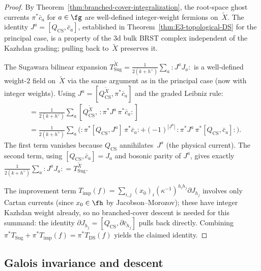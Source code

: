 \begin{proof}
By Theorem~\ref{thm:branched-cover-integralization}, the root-space
ghost currents $\pi^{*}\bar c_{a}$ for $a \in \fg$ are well-defined
integer-weight fermions on~$\widetilde X$. The identity
$J^{a} = [Q_{\mathrm{CS}}, \bar c_{a}]$, established in
Theorem~\ref{thm:E3-topological-DS}
\cite[Step~1]{Vol2-3d-gravity-thm-DS} for the principal case, is a
property of the $3$d bulk BRST complex independent of the Kazhdan
grading; pulling back to~$\widetilde X$ preserves it.

The Sugawara bilinear expansion
$T_{\mathrm{Sug}}^{\widetilde X}
 = \tfrac{1}{2(k+h^{\vee})}\sum_{a} :J^{a} J_{a}:$
is a well-defined weight-$2$ field on~$\widetilde X$ via the same
argument as in the principal case (now with integer weights).
Using $J^{a} = [Q_{\mathrm{CS}}^{\widetilde X}, \pi^{*}\bar c_{a}]$
and the graded Leibniz rule:
\begin{align*}
[Q_{\mathrm{CS}}^{\widetilde X},\, \pi^{*}G_{\mathrm{Sug}}]
&= \tfrac{1}{2(k+h^{\vee})} \sum_{a}
 [Q_{\mathrm{CS}}^{\widetilde X},\,
 {:}\pi^{*}J^{a}\, \pi^{*}\bar c_{a}{:}] \\
&= \tfrac{1}{2(k+h^{\vee})} \sum_{a}
 \bigl({:}\pi^{*}[Q_{\mathrm{CS}}, J^{a}]\, \pi^{*}\bar c_{a}{:}
 + (-1)^{|J^{a}|}\,
 {:}\pi^{*}J^{a}\, \pi^{*}[Q_{\mathrm{CS}}, \bar c_{a}]{:}\bigr).
\end{align*}
The first term vanishes because $Q_{\mathrm{CS}}$ annihilates~$J^{a}$
(the physical current). The second term, using
$[Q_{\mathrm{CS}}, \bar c_{a}] = J_{a}$ and bosonic parity of $J^{a}$,
gives exactly $\tfrac{1}{2(k+h^{\vee})}\sum_{a} {:}J^{a} J_{a}{:}
= T_{\mathrm{Sug}}^{\widetilde X}$.

The improvement term
$T_{\mathrm{imp}}(f) = \sum_{i,j} (x_{0})_{i}
 (\kappa^{-1})^{h_{i}h_{j}} \partial J_{h_{j}}$
involves only Cartan currents (since $x_{0} \in \fh$ by
Jacobson--Morozov); these have integer Kazhdan weight already, so
no branched-cover descent is needed for this summand: the identity
$\partial J_{h_{j}} = [Q_{\mathrm{CS}},
 \partial\bar c_{h_{j}}]$ pulls back directly. Combining
$\pi^{*}T_{\mathrm{Sug}} + \pi^{*}T_{\mathrm{imp}}(f)
 = \pi^{*}T_{\mathrm{DS}}(f)$
yields the claimed identity.
\end{proof}

\subsection{Galois invariance and descent}
\label{subsec:galois-descent}

